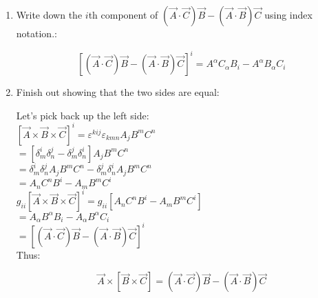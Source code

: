 \documentclass[12pt]{article}
\begin{document}
\begin{enumerate}[label=\alph*)]
\item Write down the $i$th component of $(\vec{A}\cdot \vec{C})\vec{B} - (\vec{A}\cdot \vec{B})\vec{C}$ using index notation.:\vspace{0.5em}

\[\boxed{[(\vec{A}\cdot \vec{C})\vec{B} - (\vec{A} \cdot \vec{B})\vec{C}]^i = A^\alpha C_\alpha B_i - A^\alpha B_\alpha C_i}\]

\item Finish out showing that the two sides are equal:

Let's pick back up the left side:\vspace{0.5em}\\
$[\vec{A}\times\vec{B}\times \vec{C}]^i = \varepsilon^{kij}\varepsilon_{kmn}A_jB^m C^n$\vspace{0.5em}\\
\hspace*{6em}$= \left[\delta_m^i \delta_n^j - \delta_m^j \delta^i_n\right]A_jB^mC^n$\vspace{0.5em}\\
\hspace*{6em}$=\delta_m^i \delta_n^j A_jB^mC^n - \delta_m^j \delta^i_n A_jB^mC^n$\vspace{0.5em}\\
\hspace*{6em}$= A_nC^nB^i - A_mB^mC^i$\vspace{0.5em}\\
$g_{ii}[\vec{A}\times\vec{B}\times \vec{C}]^i = g_{ii} [A_nC^nB^i - A_mB^mC^i]$\vspace{0.5em}\\
\hspace*{7em}$= A_\alpha B^\alpha B_i - A_\alpha B^\alpha C_i$\vspace{0.5em}\\
\hspace*{7em}$=[(\vec{A}\cdot \vec{C})\vec{B} - (\vec{A} \cdot \vec{B})\vec{C}]^i $\vspace{0.5em}\\
Thus:

\[\boxed{\vec{A}\times[\vec{B}\times \vec{C}] = (\vec{A}\cdot \vec{C})\vec{B} - (\vec{A} \cdot \vec{B})\vec{C}}\]


\end{enumerate}
\end{document}
